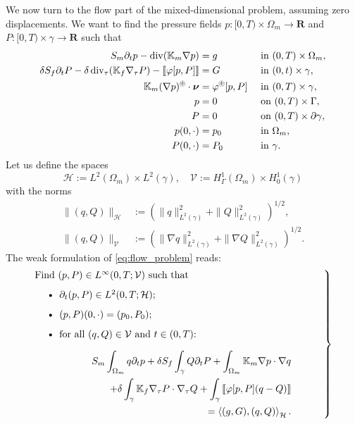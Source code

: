 \documentclass[a4paper]{article}
\def\div{\operatorname{div}}
\def\dt{\prtl_t}
\def\dual#1#2{\left\langle #1,#2\right\rangle}
\def\Hf{\mathcal H}
\def\jmp#1{\left\llbracket #1 \right\rrbracket}
\def\nnu{\vc\nu}
\def\norm#1{\|#1\|}
\def\pphi{{\varphi}}
\def\prtl{\partial}
\def\Real{{\mathbf R}}
\def\tn#1{{\mathbb{#1}}}    %
\def\Vf{{\mathcal V}} %
\def\vc#1{\mathbf{\boldsymbol{#1}}}     %
\newcommand{\eq}[1]{\begin{equation}#1\end{equation}}
\newcommand{\opm}{ %
  {\mathbin{
    \mathchoice
      {\buildcirclepm{\displaystyle     }{0.14ex}{0.95}{0.05ex}{.7}}
      {\buildcirclepm{\textstyle        }{0.14ex}{0.95}{0.05ex}{.7}}
      {\buildcirclepm{\scriptstyle      }{0.13ex}{0.955}{0.04ex}{.55}}
      {\buildcirclepm{\scriptscriptstyle}{0.08ex}{0.95}{0.03ex}{.45}}
  }} 
}
\newcommand\buildcirclepm[5]{%
  \begin{tikzpicture}[baseline=(X.base), inner sep=-#5, outer sep=-.65]
    \node[draw,circle,line width=#4] (X)  {\footnotesize\raisebox{#2}{\scalebox{#3}{$#1\pm$}}};
  \end{tikzpicture}%
}
\begin{document}
We now turn to the flow part of the mixed-dimensional problem, assuming zero displacements.
We want to find the pressure fields $p:[0,T)\times\Omega_m\to\Real$ and $P:[0,T)\times\gamma\to\Real$ such that
\begin{subequations}\label{eq:flow_problem}
\begin{align}
S_m\dt p - \div(\tn K_m\nabla p) &= g &&\mbox{ in }(0,T)\times\Omega_m,\\
\delta S_f\dt P - \delta\div_\tau(\tn K_f\nabla_\tau P) - \jmp{\pphi[p,P]} &= G &&\mbox{ in }(0,t)\times\gamma,\\
\label{eq:condition_pP} \tn K_m(\nabla p)^\opm\cdot\nnu &= \pphi^\opm[p,P] &&\mbox{ in }(0,T)\times\gamma,\\
\label{eq:bc_p} p & = 0 &&\mbox{ on }(0,T)\times\Gamma,\\
\label{eq:bc_P} P & = 0 &&\mbox{ on }(0,T)\times\prtl\gamma,\\
p(0,\cdot) & = p_0 &&\mbox{ in }\Omega_m,\\
P(0,\cdot) & = P_0 &&\mbox{ in }\gamma.
\end{align}
\end{subequations}
Let us define the spaces
\eq{ \Hf := L^2(\Omega_m)\times L^2(\gamma),\quad \Vf := H^1_\Gamma(\Omega_m)\times H^1_0(\gamma) }
with the norms
\begin{align}
\norm{(q,Q)}_\Hf &:= (\norm{q}_{L^2(\gamma)}^2 + \norm{Q}_{L^2(\gamma)}^2)^{1/2},\\
\norm{(q,Q)}_\Vf &:= (\norm{\nabla q}_{L^2(\gamma)}^2 + \norm{\nabla Q}_{L^2(\gamma)}^2)^{1/2}.
\end{align}
The weak formulation of \eqref{eq:flow_problem} reads:
\eq{ \label{eq:flow_weak} \left.\begin{minipage}{0.85\textwidth}
Find $(p,P)\in L^\infty(0,T;\Vf)$ such that
\begin{itemize}
\item $\dt(p,P)\in L^2(0,T;\Hf)$;
\item $(p,P)(0,\cdot)=(p_0,P_0)$;
\item for all $(q,Q)\in\Vf$ and $t\in(0,T)$:
\[ \begin{aligned}S_m\int_{\Omega_m}q\dt p + \delta S_f\int_\gamma Q\dt P + \int_{\Omega_m}\tn K_m\nabla p\cdot\nabla q\\
+ \delta\int_\gamma\tn K_f\nabla_\tau P\cdot\nabla_\tau Q + \int_\gamma\jmp{\pphi[p,P](q-Q)}\\
= \dual{(g,G)}{(q,Q)}_\Hf.\end{aligned} \]
\end{itemize}
\end{minipage}\right\} }
\end{document}
